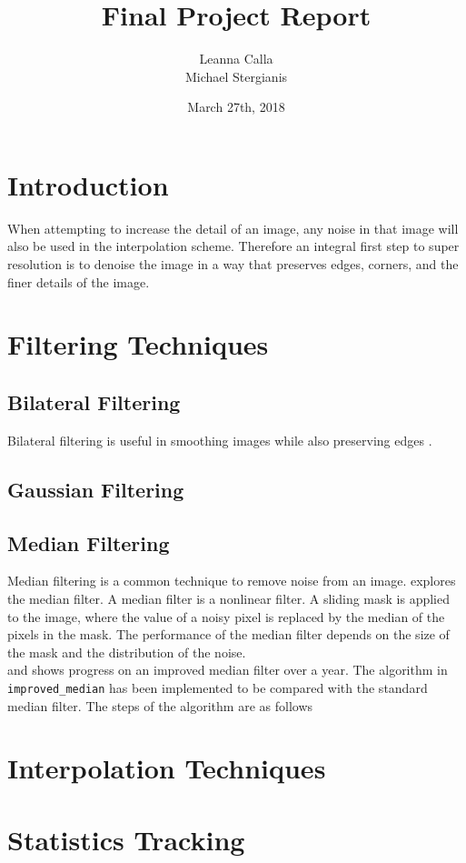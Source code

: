 \documentclass{article}
\title{Final Project Report}
\author{Leanna Calla \\ Michael Stergianis}
\date{March 27th, 2018}
\begin{document}
\maketitle
%
\section{Introduction}
\begin{flushleft}
  When attempting to increase the detail of an image, any noise in
  that image will also be used in the interpolation scheme. Therefore
  an integral first step to super resolution is to denoise the image
  in a way that preserves edges, corners, and the finer details of the
  image.
\end{flushleft}
%
\section{Filtering Techniques}
\subsection{Bilateral Filtering}
Bilateral filtering is useful in smoothing images while also
preserving edges \cite{Paris}.
\subsection{Gaussian Filtering}
\subsection{Median Filtering}
%
\begin{flushleft}
  Median filtering is a common technique to remove noise from an
  image. \cite{Med2012} explores the median filter. A median filter is a
  nonlinear filter. A sliding mask is applied to the image, where the
  value of a noisy pixel is replaced by the median of the pixels in
  the mask. The performance of the median filter depends on the size
  of the mask and the distribution of the noise.\\
   \cite{improved-median} and \cite{Med2012} shows progress on an
   improved median filter over a year. The algorithm in
   \texttt{improved_median} has been implemented to be compared with
   the standard median filter. The steps of the algorithm are as
   follows 
  \end{flushleft}
%
\section{Interpolation Techniques}
%
\section{Statistics Tracking}
%
\newpage
\printbibliography
\end{document}
